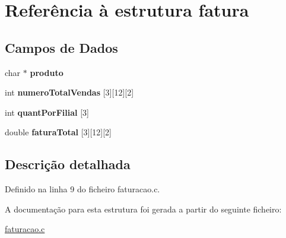 \hypertarget{structfatura}{}\section{Referência à estrutura fatura}
\label{structfatura}
\subsection*{Campos de Dados}
\begin{DoxyCompactItemize}
\item 
\mbox{\label{structfatura_a2b933b813c749cf48e4b14fcdad9043f}} 
char $\ast$ {\bfseries produto}
\item 
\mbox{\label{structfatura_a052c2d1f53b947380039186916b15d45}} 
int {\bfseries numero\+Total\+Vendas} \mbox{[}3\mbox{]}\mbox{[}12\mbox{]}\mbox{[}2\mbox{]}
\item 
\mbox{\label{structfatura_a7505e34fb09c15f7618d4dd358e2cc3f}} 
int {\bfseries quant\+Por\+Filial} \mbox{[}3\mbox{]}
\item 
\mbox{\label{structfatura_a2d46cff58fb9c82e7a8a9f68c4ddaf26}} 
double {\bfseries fatura\+Total} \mbox{[}3\mbox{]}\mbox{[}12\mbox{]}\mbox{[}2\mbox{]}
\end{DoxyCompactItemize}


\subsection{Descrição detalhada}


Definido na linha 9 do ficheiro faturacao.\+c.



A documentação para esta estrutura foi gerada a partir do seguinte ficheiro\+:\begin{DoxyCompactItemize}
\item 
\hyperlink{faturacao_8c}{faturacao.\+c}\end{DoxyCompactItemize}
